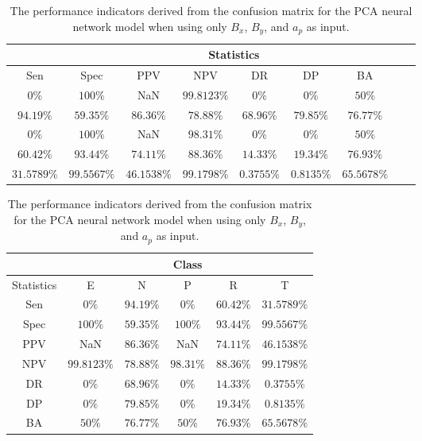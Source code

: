 \begin{table}[!ht]
	\centering
	\begin{tabular}{|c|c|c|c|c|c|c|c|c|}
		\hline
		 & \multicolumn{7}{c|}{Statistics} \\ \hline
		Sen & Spec & PPV & NPV & DR & DP & BA \\ \hline
		$0\%$ & $100\%$ & NaN & $99.8123\%$ & $0\%$ & $0\%$ & $50\%$ \\ \hline
		$94.19\%$ & $59.35\%$ & $86.36\%$ & $78.88\%$ & $68.96\%$ & $79.85\%$ & $76.77\%$ \\ \hline
		$0\%$ & $100\%$ & NaN & $98.31\%$ & $0\%$ & $0\%$ & $50\%$ \\ \hline
		$60.42\%$ & $93.44\%$ & $74.11\%$ & $88.36\%$ & $14.33\%$ & $19.34\%$ & $76.93\%$ \\ \hline
		$31.5789\%$ & $99.5567\%$ & $46.1538\%$ & $99.1798\%$ & $0.3755\%$ & $0.8135\%$ & $65.5678\%$ \\ \hline
	\end{tabular}
	\caption{The performance indicators derived from the confusion matrix for the PCA neural network model when using only $B_{x}$, $B_{y}$, and $a_{p}$ as input.}
	\label{tab:cs:xyap:pcaNNet}
\end{table}

\begin{table}[!ht]
	\centering
	\begin{tabular}{|c|c|c|c|c|c|}
		\hline
		 & \multicolumn{5}{c|}{Class} \\ \hline
		Statistics & E & N & P & R & T \\ \hline
		Sen & $0\%$ & $94.19\%$ & $0\%$ & $60.42\%$ & $31.5789\%$ \\ \hline
		Spec & $100\%$ & $59.35\%$ & $100\%$ & $93.44\%$ & $99.5567\%$ \\ \hline
		PPV & NaN & $86.36\%$ & NaN & $74.11\%$ & $46.1538\%$ \\ \hline
		NPV & $99.8123\%$ & $78.88\%$ & $98.31\%$ & $88.36\%$ & $99.1798\%$ \\ \hline
		DR & $0\%$ & $68.96\%$ & $0\%$ & $14.33\%$ & $0.3755\%$ \\ \hline
		DP & $0\%$ & $79.85\%$ & $0\%$ & $19.34\%$ & $0.8135\%$ \\ \hline
		BA & $50\%$ & $76.77\%$ & $50\%$ & $76.93\%$ & $65.5678\%$ \\ \hline
	\end{tabular}
	\caption{The performance indicators derived from the confusion matrix for the PCA neural network model when using only $B_{x}$, $B_{y}$, and $a_{p}$ as input.}
	\label{tab:cs:reverse:xyap:pcaNNet}
\end{table}
